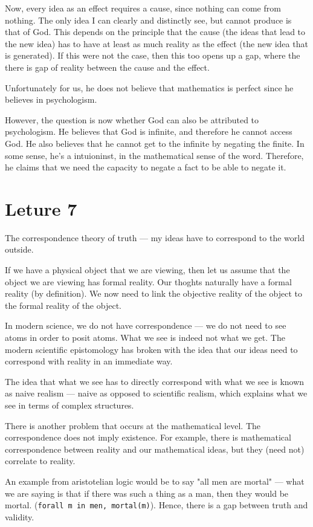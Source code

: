 \documentclass[11pt]{book}
\begin{document}
Now, every idea as an effect requires a cause, since nothing can come from
nothing. The only idea I can clearly and distinctly see, but cannot produce is
that of God. This depends on the principle that the cause (the ideas that lead
to the new idea) has to have at least as much reality as the effect (the new
idea that is generated). If this were not the case, then this too opens up a
gap, where the there is gap of reality between the cause and the effect.

Unfortunately for us, he does not believe that mathematics is perfect since he
believes in psychologism. 

However, the question is now whether God can also be attributed to
psychologism.  He believes that God is infinite, and therefore he cannot access
God. He also believes that he cannot get to the infinite by negating the
finite. In some sense, he's a intuioninst, in the mathematical sense of the
word.  Therefore, he claims that we need the capacity to negate a fact to be
able to negate it.

\section{Leture 7}

The correspondence theory of truth --- my ideas have to correspond to the
world outside.

If we have a physical object that we are viewing, then let us assume that
the object we are viewing has formal reality. Our thoghts naturally have
a formal reality (by definition). We now need to link the objective reality
of the object to the formal reality of the object.

In modern science, we do not have correspondence --- we do not need to see
atoms in order to posit atoms. What we see is indeed not what we get. The
modern scientific epistomology has broken with the idea that our ideas need to
correspond with reality in an immediate way.

The idea that what we see has to directly correspond with what we see is known
as naive realism --- naive as opposed to scientific realism, which explains what
we see in terms of complex structures.

There is another problem that occurs at the mathematical level. The correspondence
does not imply existence. For example, there is  mathematical correspondence
between reality and our mathematical ideas, but they (need not) correlate to
reality.

An example from aristotelian logic would be to say "all men are mortal" --- what
we are saying is that if there was such a thing as a man, then they would be mortal.
({\texttt{forall m in men, mortal(m)}}). Hence, there is a gap between truth
and validity.
\end{document}
